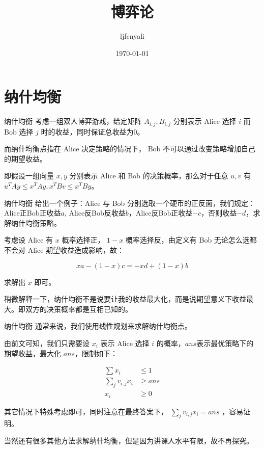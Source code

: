 \documentclass[9pt]{beamer}
\title{博弈论}
\date{\today}
\author{ljfcnyali}
\begin{document}
  \maketitle

  \section{纳什均衡}

  \begin{frame}{纳什均衡}
     考虑一组双人博弈游戏，给定矩阵 $A_{i,j},B_{i,j}$ 分别表示 Alice 选择 $i$ 而 Bob 选择 $j$ 时的收益，同时保证总收益为0。
  
     而纳什均衡点指在 Alice 决定策略的情况下， Bob 不可以通过改变策略增加自己的期望收益。

     即假设一组向量 $x,y$ 分别表示 Alice 和 Bob 的决策概率，那么对于任意 $u,v$ 有 $u^TAy\leq x^TAy,x^TBv\leq x^TBy$。
  \end{frame}

  \begin{frame}{纳什均衡}
     给出一个例子：Alice 与 Bob 分别选取一个硬币的正反面，我们规定：Alice正Bob正收益$a$, Alice反Bob反收益$b$，Alice反Bob正收益$-c$，否则收益$-d$，求解纳什均衡策略。
  
     考虑设 Alice 有 $x$ 概率选择正， $1-x$ 概率选择反，由定义有 Bob 无论怎么选都不会对 Alice 期望收益造成影响，故：
    
     $$ xa-(1-x)c=-xd+(1-x)b $$

     求解出 $x$ 即可。

     稍微解释一下，纳什均衡不是说要让我的收益最大化，而是说期望意义下收益最大。即双方的决策概率都是互相已知的。
  \end{frame}

  \begin{frame}{纳什均衡}
     通常来说，我们使用线性规划来求解纳什均衡点。

     由前文可知，我们只需要设 $x_i$ 表示 Alice 选择 $i$ 的概率，$ans$表示最优策略下的期望收益，最大化 $ans$，限制如下：
    
    $$
    \begin{aligned}
      \sum x_i &\leq 1\\
      \sum_j v_{i,j}x_i &\geq ans \\
      x_i&\geq 0
    \end{aligned}
    $$

     其它情况下特殊考虑即可，同时注意在最终答案下， $\sum_j v_{i,j}x_i=ans$ ，容易证明。

     当然还有很多其他方法求解纳什均衡，但是因为讲课人水平有限，故不再探究。
  \end{frame}
  
\end{document}
